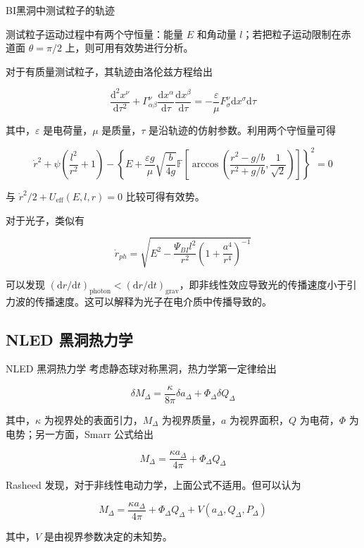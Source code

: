 \documentclass[9pt, dvipsnames]{beamer} %
\begin{document}
\begin{frame}{BI黑洞中测试粒子的轨迹}

    测试粒子运动过程中有两个守恒量：能量 $E$ 和角动量 $l$；若把粒子运动限制在赤道面 $\theta=\pi/2$ 上，则可用有效势进行分析。

    对于有质量测试粒子，其轨迹由洛伦兹方程给出

    $$
    \frac{\mathrm{d}^2 x^\nu }{\mathrm{d}\tau^2 } + \Gamma_{\alpha\beta}^\nu \frac{\mathrm{d}x^\alpha }{\mathrm{d}\tau } \frac{\mathrm{d}x^\beta }{\mathrm{d}\tau } 
    =-\frac{\varepsilon }{\mu } F_{\sigma}^{\nu} \mathrm{d}x^\sigma \mathrm{d}\tau
    $$

    其中，$\varepsilon$ 是电荷量，$\mu$ 是质量，$\tau$ 是沿轨迹的仿射参数。利用两个守恒量可得

    $$
    \dot{r}^2 + \psi\left(\frac{l^2 }{r^2 } + 1 \right) - \left\{E+\frac{\varepsilon g }{\mu } \sqrt{\frac{b }{4g } } \mathbb{F} \left[\arccos\left(\frac{r^2-g/b }{r^2+g/b }  , \frac{1 }{\sqrt{2} }  \right) \right] \right\}^2=0
    $$

    与 $\dot{r}^2/2+U_{\mathrm{eff}}(E,l,r)=0$ 比较可得有效势。

    对于光子，类似有

    $$
    \dot{r}_{ph}
    =\sqrt{E^2 - \frac{\Psi_{BI} l^2 }{r^2 } \left(1+\frac{a^4 }{r^4 }  \right)^{-1}} 
    $$

    可以发现 $(\mathrm{d}r/\mathrm{d}t)_{\mathrm{photon}}<(\mathrm{d}r/\mathrm{d}t)_{\mathrm{grav}}$，即非线性效应导致光的传播速度小于引力波的传播速度。这可以解释为光子在电介质中传播导致的。
    
\end{frame}

\subsection{NLED 黑洞热力学}

\begin{frame}{NLED 黑洞热力学}
    考虑静态球对称黑洞，热力学第一定律给出

    $$
    \delta M_{\Delta} = \frac{\kappa }{8\pi } \delta a_{\Delta} + \Phi_\Delta \delta Q_\Delta
    $$

    其中，$\kappa$ 为视界处的表面引力，$M_\Delta$ 为视界质量，$a$ 为视界面积，$Q$ 为电荷，$\Phi$ 为电势；另一方面，Smarr 公式给出

    $$
    M_\Delta = \frac{\kappa a_\Delta }{4\pi } + \Phi_\Delta Q_\Delta
    $$

    Rasheed 发现，对于非线性电动力学，上面公式不适用。但可以认为

    $$
    M_\Delta = \frac{\kappa a_\Delta }{4\pi } + \Phi_\Delta Q_\Delta + V\left(a_\Delta , Q_\Delta , P_\Delta \right)
    $$

    其中，$V$ 是由视界参数决定的未知势。

\end{frame}
\end{document}
